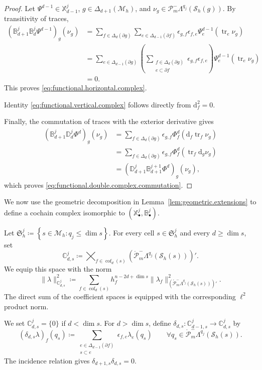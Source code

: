 \documentclass[a4paper,11pt]{article}
\theoremstyle{definition}
\newcommand{\DIFF}{\mathrm{d}}
\newcommand{\Mh}{\mathcal{M}_h}
\newcommand{\Sh}{\mathcal{S}_h}
\newcommand{\FM}[1]{\Delta_{#1}}
\newcommand{\cof}[1]{\operatorname{cof}_{#1}}
\newcommand{\PLtrim}[2]{\mathcal{P}_{#1}^{-}\Lambda^{#2}}
\newcommand{\trc}{\operatorname{tr}}
\newcommand{\PLtrimz}[2]{\mathring{\mathcal P}_{#1}^{-}\Lambda^{#2}}
\begin{document}
\begin{proof}
Let $\Psi^{d-1}\in\mathbb X_{d-1}^j$, $g\in\FM{d+1}(\Mh)$, and $\nu_g\in\PLtrim{m}{q_j}(\Sh(g))$.
By transitivity of traces,
\[
\begin{aligned}
\left(
\mathbb B_{d+1}^j\mathbb B_d^j\Psi^{d-1}
\right)_g(\nu_g)
&=
\sum_{f\in\FM{d}(\partial g)}
\sum_{e\in\FM{d-1}(\partial f)}
\epsilon_{g,f}\epsilon_{f,e}
\Psi_e^{d-1}(\trc_e\nu_g)
\\
&=
\sum_{e\in\FM{d-1}(\partial g)}
\left(
\sum_{\substack{
f\in\FM{d}(\partial g)\\
e\subset\partial f
}}
\epsilon_{g,f}\epsilon_{f,e}
\right)
\Psi_e^{d-1}(\trc_e\nu_g)
\\
&=
0.
\end{aligned}
\]
This proves \eqref{eq:functional.horizontal.complex}.

Identity \eqref{eq:functional.vertical.complex} follows directly from $\DIFF_f^2=0$.

Finally, the commutation of traces with the exterior derivative gives
\[
\begin{aligned}
\left(
\mathbb B_{d+1}^j\mathbb D_d^j\Phi^d
\right)_g(\nu_g)
&=
\sum_{f\in\FM{d}(\partial g)}
\epsilon_{g,f}
\Phi_f^d(\DIFF_f\trc_f\nu_g)
\\
&=
\sum_{f\in\FM{d}(\partial g)}
\epsilon_{g,f}
\Phi_f^d(\trc_f\DIFF_g\nu_g)
\\
&=
\left(
\mathbb D_{d+1}^j
\mathbb B_{d+1}^{j+1}\Phi^d
\right)_g(\nu_g),
\end{aligned}
\]
which proves \eqref{eq:functional.double.complex.commutation}.
\end{proof}

We now use the geometric decomposition in Lemma~\ref{lem:geometric.extensions} to define a cochain complex isomorphic to $\left(\mathbb X_\bullet^j,\mathbb B_\bullet^j\right)$.

Let $\mathfrak S_h^j\coloneqq\left\{s\in\Mh:q_j\leq\dim s\right\}$.
For every cell $s\in\mathfrak S_h^j$ and every $d\geq\dim s$, set
\[
\mathbb C_{d,s}^j
\coloneqq
\bigtimes_{f\in\cof{d}(s)}
\left(\PLtrimz{m}{q_j}(\Sh(s))\right)'.
\]
We equip this space with the norm
\[
\|\lambda\|_{\mathbb C_{d,s}^j}^2
\coloneqq
\sum_{f\in\cof{d}(s)}
h_f^{n-2d+\dim s}
\|\lambda_f\|_{\left(\PLtrimz{m}{q_j}(\Sh(s))\right)'}^2.
\]
The direct sum of the coefficient spaces is equipped with the corresponding $\ell^2$ product norm.

We set $\mathbb C_{d,s}^j=\{0\}$ if $d<\dim s$.
For $d>\dim s$, define $\delta_{d,s}\colon \mathbb C_{d-1,s}^j \longrightarrow \mathbb C_{d,s}^j$ by
\[
\left(\delta_{d,s}\lambda\right)_f(q_s)
\coloneqq
\sum_{\substack{
e\in\FM{d-1}(\partial f)\\
s\subset e
}}
\epsilon_{f,e}\lambda_e(q_s)
\qquad
\forall q_s\in\PLtrimz{m}{q_j}(\Sh(s)).
\]
The incidence relation gives $\delta_{d+1,s} \delta_{d,s}=0$.
\end{document}
